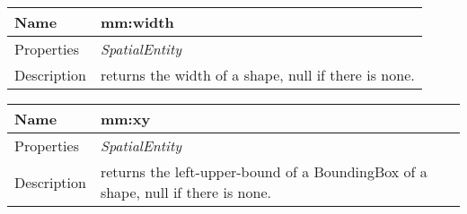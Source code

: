 \vspace{0.3cm}
\newline
\begin{tabular}{|p{3cm}|p{10cm}|}
\hline Name & mm:width\\
\hline Properties & \textit{SpatialEntity} \\
\hline Description & returns the width of a shape, null if there is none.\\
\hline
\end{tabular}
\vspace{0.3cm}
\newline
\begin{tabular}{|p{3cm}|p{10cm}|}
\hline Name & mm:xy\\
\hline Properties & \textit{SpatialEntity} \\
\hline Description & returns the left-upper-bound of a BoundingBox of a shape, null if there is none.\\
\hline
\end{tabular}
\vspace{0.3cm}
\newline
